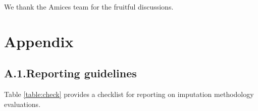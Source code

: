 \documentclass[bimj,fleqn]{w-art}
\begin{document}

\begin{acknowledgement}
We thank the Amices team for the fruitful discussions.
\end{acknowledgement}
\vspace*{1pc}



\section*{Appendix}

\subsection*{A.1.\enspace Reporting guidelines}

Table \ref{table:check} provides a checklist for reporting on imputation methodology evaluations. 
\end{document}
